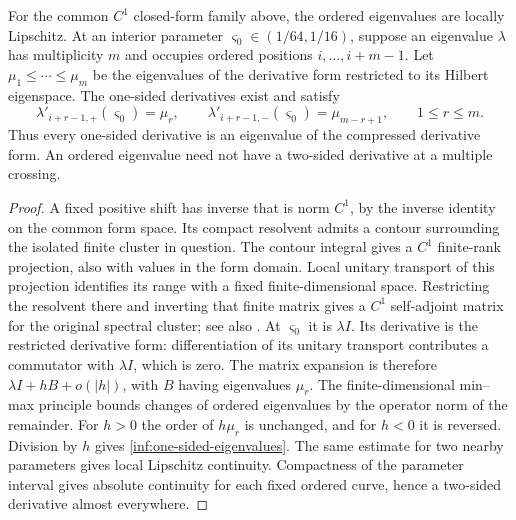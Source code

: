 \begin{lemma}\label{inf:ordered-eigenvalues}
For the common $C^1$ closed-form family above, the ordered
eigenvalues are locally Lipschitz. At an interior parameter
$\varsigma_0\in(1/64,1/16)$, suppose an eigenvalue $\lambda$ has multiplicity
$m$ and occupies ordered positions $i,\ldots,i+m-1$.
Let $\mu_1\le\cdots\le\mu_m$ be the eigenvalues of the derivative
form restricted to its Hilbert eigenspace. The one-sided
derivatives exist and satisfy
\begin{equation}\label{inf:one-sided-eigenvalues}
 \lambda'_{i+r-1,+}(\varsigma_0)=\mu_r,\qquad
 \lambda'_{i+r-1,-}(\varsigma_0)=\mu_{m-r+1},\qquad 1\le r\le m.
\end{equation}
Thus every one-sided derivative is an eigenvalue of the
compressed derivative form. An ordered eigenvalue need not
have a two-sided derivative at a multiple crossing.
\end{lemma}
\begin{proof}
A fixed positive shift has inverse that is norm $C^1$, by the
inverse identity on the common form space. Its compact resolvent
admits a contour surrounding the isolated finite cluster in
question. The contour integral gives a $C^1$ finite-rank
projection, also with values in the form domain. Local unitary
transport of this projection identifies its range with a fixed
finite-dimensional space. Restricting the resolvent there and
inverting that finite matrix gives a $C^1$ self-adjoint matrix
for the original spectral cluster; see also
\cite[Chapter~II, Theorem~5.4 and Theorem~6.8]{inf:kato}.
At $\varsigma_0$ it is $\lambda I$. Its derivative is the
restricted derivative form: differentiation of its unitary
transport contributes a commutator with $\lambda I$, which is
zero. The matrix expansion is therefore $\lambda I+hB+o(|h|)$,
with $B$ having eigenvalues $\mu_r$.
The finite-dimensional min--max principle bounds changes of
ordered eigenvalues by the operator norm of the remainder.
For $h>0$ the order of $h\mu_r$ is unchanged, and for $h<0$ it
is reversed. Division by $h$ gives
\eqref{inf:one-sided-eigenvalues}.
The same estimate for two nearby parameters gives local
Lipschitz continuity. Compactness of the parameter interval
gives absolute continuity for each fixed ordered curve, hence
a two-sided derivative almost everywhere.
\end{proof}

